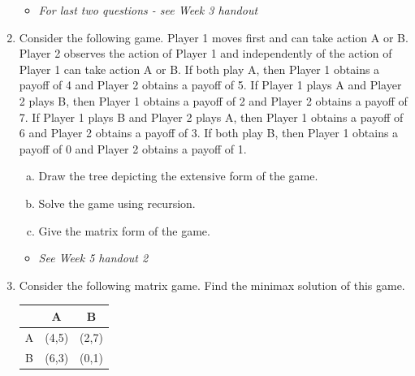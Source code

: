 \documentclass[]{report}
\begin{document}
\begin{enumerate}
\begin{itemize}
\item \textit{For last two questions - see Week 3 handout}
\end{itemize}
\item  Consider the following game. Player 1 moves first and can take action A or B.
 Player 2 observes the action of Player 1 and independently of the action of Player 1 can
 take action A or B. If both play A, then Player 1 obtains a payoff of 4 and Player 2
 obtains a payoff of 5. If Player 1 plays A and Player 2 plays B, then Player 1 obtains a
 payoff of 2 and Player 2 obtains a payoff of 7. If Player 1 plays B and Player 2 plays A,
 then Player 1 obtains a payoff of 6 and Player 2 obtains a payoff of 3. If both play B,
 then Player 1 obtains a payoff of 0 and Player 2 obtains a payoff of 1.
\begin{enumerate}[(a)]
\item Draw the tree depicting the extensive form of the game.
\item Solve the game using recursion.
\item Give the matrix form of the game.
\end{enumerate} 
\smallskip
\begin{itemize}
	
	\item \textit{See Week 5 handout 2}
	
\end{itemize}
\item Consider the following matrix game. Find the minimax solution of this game.
\begin{center}
	\begin{tabular}{|c|c|c|} \hline   & A & B\\ \hline
 A &(4,5)& (2,7)\\ \hline
 B & (6,3)& (0,1)\\ \hline
\end{tabular}
\end{center}



\end{enumerate}
\end{document}
